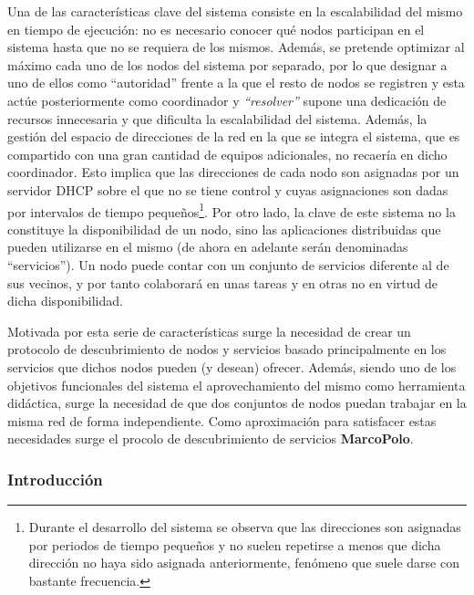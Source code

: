 Una de las características clave del sistema consiste en la escalabilidad del mismo en tiempo de ejecución: no es necesario conocer qué nodos participan en el sistema hasta que no se requiera de los mismos. Además, se pretende optimizar al máximo cada uno de los nodos del sistema por separado, por lo que designar a uno de ellos como ``autoridad'' frente a la que el resto de nodos se registren y esta actúe posteriormente como coordinador y \textit{``resolver''} supone una dedicación de recursos innecesaria y que dificulta la escalabilidad del sistema. Además, la gestión del espacio de direcciones de la red en la que se integra el sistema, que es compartido con una gran cantidad de equipos adicionales, no recaería en dicho coordinador. Esto implica que las direcciones de cada nodo son asignadas por un servidor DHCP sobre el que no se tiene control y cuyas asignaciones son dadas por intervalos de tiempo pequeños\footnote{Durante el desarrollo del sistema se observa que las direcciones son asignadas por periodos de tiempo pequeños y no suelen repetirse a menos que dicha dirección no haya sido asignada anteriormente, fenómeno que suele darse con bastante frecuencia.}. %
Por otro lado, la clave de este sistema no la constituye la disponibilidad de un nodo, sino las aplicaciones distribuidas que pueden utilizarse en el mismo (de ahora en adelante serán denominadas ``servicios''). Un nodo puede contar con un conjunto de servicios diferente al de sus vecinos, y por tanto colaborará en unas tareas y en otras no en virtud de dicha disponibilidad.%

Motivada por esta serie de características surge la necesidad de crear un protocolo de descubrimiento de nodos y servicios basado principalmente en los servicios que dichos nodos pueden (y desean) ofrecer. Además, siendo uno de los objetivos funcionales del sistema el aprovechamiento del mismo como herramienta didáctica, surge la necesidad de que dos conjuntos de nodos puedan trabajar en la misma red de forma independiente. Como aproximación para satisfacer estas necesidades surge el procolo de descubrimiento de servicios \textbf{MarcoPolo}.

\subsubsection{Introducción}

